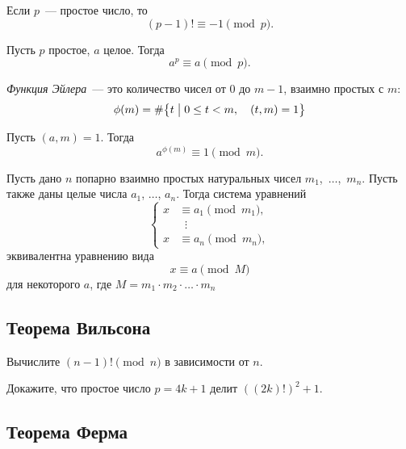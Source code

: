 
Если $p$~--- простое число, то
\[
    (p - 1)!
\equiv
    -1 \pmod p
.\]

Пусть $p$ простое, $a$ целое.
Тогда
\[
    a^p \equiv a \pmod p
.\]

\emph{Функция Эйлера}~--- это количество чисел от $0$ до $m-1$, взаимно простых с $m$:
\[
    \phi(m)
=
    \#
    \bigl\{
        t
    \bigm|
        0 \leq t < m
    ,\quad
        (t, m) = 1
    \bigr\}
\]

Пусть $(a, m) = 1$.
Тогда
\[
    a^{\phi(m)} \equiv 1 \pmod m
.\]

Пусть дано $n$ попарно взаимно простых натуральных чисел
$m_{1}$,~$\ldots$,~$m_{n}$.
Пусть также даны целые числа $a_1$, $\ldots$, $a_n$.
Тогда система уравнений
\[
\left\{\begin{aligned}
    x &\equiv a_1 \pmod {m_1}
,\\[-5pt]
    &\;\;\vdots
\\[-5pt]
    x &\equiv a_n \pmod {m_n}
,\end{aligned}\right.
\]
эквивалентна уравнению вида
\[
    x \equiv a \pmod {M}
\]
для некоторого $a$, где $M = m_1 \cdot m_2 \cdot \ldots \cdot m_n$


\subsection*{Теорема Вильсона}

\begin{problems}

\item
Вычислите $(n - 1)! \pmod n$ в зависимости от $n$.

\item
Докажите, что простое число $p = 4 k + 1$ делит $((2 k)!)^2 + 1$.

\end{problems}


\subsection*{Теорема Ферма}

